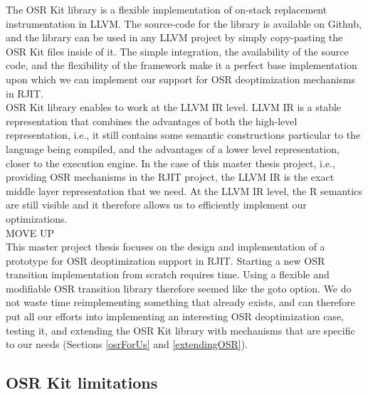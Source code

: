 The OSR Kit library\cite{OSRKit} is a flexible implementation of on-stack replacement instrumentation in LLVM.
The source-code for the library is available on Github\cite{OSRKitGit}, and the library can be used in any LLVM project by simply copy-pasting the OSR Kit files inside of it.
The simple integration, the availability of the source code, and the flexibility of the framework make it a perfect base implementation upon which we can implement our support for OSR deoptimization mechanisms in RJIT.\\

OSR Kit library enables to work at the LLVM IR level.
LLVM IR is a stable representation that combines the advantages of both the high-level representation, i.e., it still contains some semantic constructions particular to the language being compiled, and the advantages of a lower level representation, closer to the execution engine.
In the case of this master thesis project, i.e., providing OSR mechanisms in the RJIT project, the LLVM IR is the exact middle layer representation that we need. 
At the LLVM IR level, the R semantics are still visible and it therefore allows us to efficiently implement our optimizations.\\

MOVE UP\\

This master project thesis focuses on the design and implementation of a prototype for OSR deoptimization support in RJIT.
Starting a new OSR transition implementation from scratch requires time.
Using a flexible and modifiable OSR transition library therefore seemed like the goto option.
We do not waste time reimplementing something that already exists, and can therefore put all our efforts into implementing an interesting OSR deoptimization case, testing it, and extending the OSR Kit library with mechanisms that are specific to our needs (Sections \ref{osrForUs} and \ref{extendingOSR}).\\

\subsection{OSR Kit limitations}\label{osrkitlimitations}

